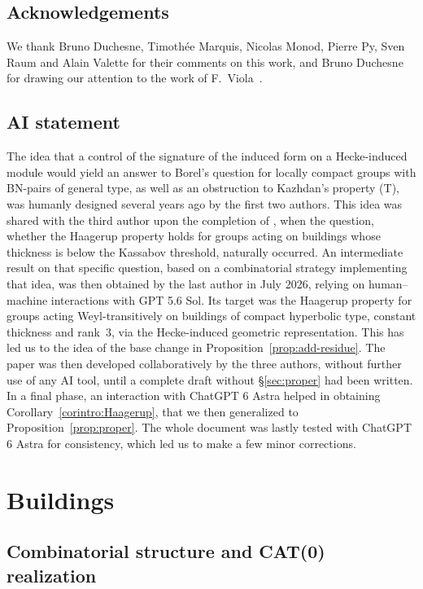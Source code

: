 \documentclass[12pt,a4paper]{amsproc}
\theoremstyle{definition}
\begin{document}
\subsection*{Acknowledgements}

We thank Bruno Duchesne, Timothée Marquis, Nicolas Monod, Pierre Py, Sven Raum and Alain Valette for their comments on this work, and Bruno Duchesne for drawing our attention to the work of F.~Viola~\cite{Viola}.

\subsection*{AI statement}
The idea that a control of the signature of the induced form on a Hecke-induced module would yield an answer to Borel's question for locally compact groups with BN-pairs of general type, as well as an obstruction to Kazhdan's property (T), was   humanly designed several years ago by the first two authors. This idea was shared with the third author upon the completion of \cite{CapTho}, when the question, whether the Haagerup property holds for groups acting on buildings whose thickness is below the Kassabov threshold, naturally occurred. An intermediate result on that specific question,  based on a combinatorial strategy implementing that idea,  was then obtained  by the last author in July 2026, relying on human--machine interactions with GPT 5.6 Sol.  Its target was the Haagerup property  for groups acting Weyl-transitively on buildings of compact hyperbolic type, constant thickness and rank~$3$, via the Hecke-induced geometric representation. This has led us to the idea of the base change in Proposition~\ref{prop:add-residue}. The paper was then developed collaboratively by the three authors, without   further use of any AI  tool, until a complete draft without \S\ref{sec:proper} had been written. In a final phase, an interaction with  ChatGPT 6 Astra helped in obtaining Corollary~\ref{corintro:Haagerup}, that we then generalized to Proposition~\ref{prop:proper}. The whole document was lastly tested with   ChatGPT 6 Astra for consistency, which led us to make a few minor corrections.  

\section{Buildings}


\subsection{Combinatorial structure and  CAT(0) realization}
\end{document}
